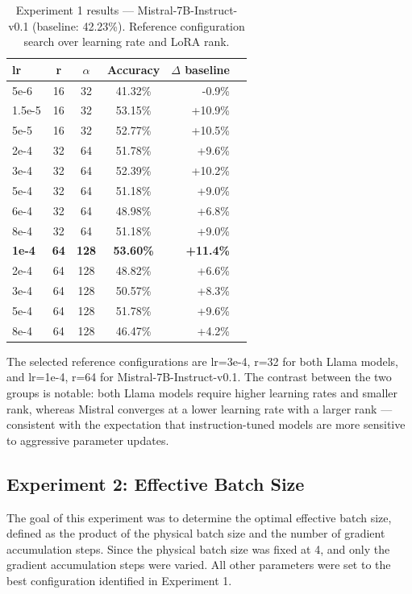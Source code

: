   \begin{table}[ht]
  \caption{Experiment 1 results --- Mistral-7B-Instruct-v0.1 (baseline: 42.23\%). Reference configuration search over learning rate and LoRA rank.}
  \centering
  \footnotesize
  \begin{tabular}{lcccrr}
  \toprule
  \textbf{lr} & \textbf{r} & \textbf{$\alpha$} & \textbf{Accuracy} & \textbf{$\Delta$ baseline} \\
  \midrule
    5e-6   & 16 & 32 & 41.32\% & -0.9\% \\
    1.5e-5 & 16 & 32 & 53.15\% & +10.9\%\\
    5e-5   & 16 & 32 & 52.77\% & +10.5\% \\
  \midrule
  2e-4 & 32 & 64 & 51.78\% & +9.6\% \\
  3e-4 & 32 & 64 & 52.39\% & +10.2\% \\
  5e-4 & 32 & 64 & 51.18\% & +9.0\% \\
  6e-4 & 32 & 64 & 48.98\% & +6.8\% \\
  8e-4 & 32 & 64 & 51.18\% & +9.0\% \\
  \midrule
  \textbf{1e-4} & \textbf{64} & \textbf{128} & \textbf{53.60\%} & \textbf{+11.4\%} \\
  2e-4 & 64 & 128 & 48.82\% & +6.6\% \\
  3e-4 & 64 & 128 & 50.57\% & +8.3\% \\
  5e-4 & 64 & 128 & 51.78\% & +9.6\% \\
  8e-4 & 64 & 128 & 46.47\% & +4.2\% \\
  \bottomrule
  \end{tabular}

  \label{tab:exp1-mistral}
  \end{table}
The selected reference configurations are lr=3e-4, r=32
  for both Llama models, and lr=1e-4, r=64 for
  Mistral-7B-Instruct-v0.1. The contrast between the two groups is
  notable: both Llama models require higher learning rates and smaller
  rank, whereas Mistral converges at a lower learning rate with a
  larger rank --- consistent with the expectation that instruction-tuned
  models are more sensitive to aggressive parameter updates.

\subsection{Experiment 2: Effective Batch Size}

  The goal of this experiment was to determine the
  optimal effective batch size, defined as the product
  of the physical batch size and the number of gradient
  accumulation steps. Since the physical batch size was
  fixed at 4, and only the
  gradient accumulation steps were varied. All other
  parameters were set to the best configuration
  identified in Experiment 1.

